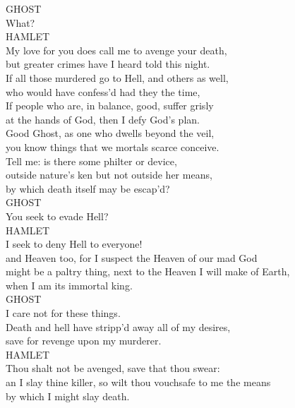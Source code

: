 \noindent{}GHOST\\
What?\\

\noindent{}HAMLET\\
My love for you does call me to avenge your death,\\
but greater crimes have I heard told this night.\\
If all those murdered go to Hell, and others as well,\\
who would have confess'd had they the time,\\
If people who are, in balance, good, suffer grisly\\
at the hands of God, then I defy God's plan.\\

\noindent{}Good Ghost, as one who dwells beyond the veil,\\
you know things that we mortals scarce conceive.\\
Tell me: is there some philter or device,\\
outside nature's ken but not outside her means,\\
by which death itself may be escap'd?\\

\noindent{}GHOST\\
You seek to evade Hell?\\

\noindent{}HAMLET\\
I seek to deny Hell to everyone!\\
and Heaven too, for I suspect the Heaven of our mad God\\
might be a paltry thing, next to the Heaven I will make of Earth,\\
when I am its immortal king.\\

\noindent{}GHOST\\
I care not for these things.\\
Death and hell have stripp'd away all of my desires,\\
save for revenge upon my murderer.\\

\noindent{}HAMLET\\
Thou shalt not be avenged, save that thou swear:\\
an I slay thine killer, so wilt thou vouchsafe to me the means\\
by which I might slay death.\\

